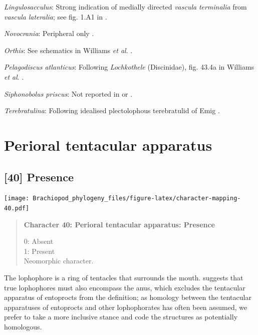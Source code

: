 \documentclass[openany]{book}
\begin{document}
\hypertarget{Lingulosacculus-coding-39}{}
\emph{Lingulosacculus}: Strong indication of medially directed
\emph{vascula} \emph{terminalia} from \emph{vascula} \emph{lateralia};
see fig. 1.A1 in \citet{Balthasar2009EarlyCambrian}.

\hypertarget{Novocrania-coding-39}{}
\emph{Novocrania}: Peripheral only
\citep[p.158]{Williams2000LinguliformeaCraniiformea}.

\hypertarget{Orthis-coding-39}{}
\emph{Orthis}: See schematics in Williams \emph{et al}.
\citeyearpar{Williams2000LinguliformeaCraniiformea}.

\hypertarget{Pelagodiscus_atlanticus-coding-39}{}
\emph{Pelagodiscus atlanticus}: Following \emph{Lochkothele}
(Discinidae), fig. 43.4a in Williams \emph{et al}.
\citeyearpar{Williams2000LinguliformeaCraniiformea}.

\hypertarget{Siphonobolus_priscus-coding-39}{}
\emph{Siphonobolus priscus}: Not reported in
\citet{Havlicek1982LingulaceaPaterinacea} or
\citet{Williams2000LinguliformeaCraniiformea}.

\hypertarget{Terebratulina-coding-39}{}
\emph{Terebratulina}: Following idealised plectolophous terebratulid of
Emig \citeyearpar{Emig1992Functionaldisposition}.

\section{Perioral tentacular
apparatus}\label{perioral-tentacular-apparatus}

\subsection*{{[}40{]} Presence}\label{presence-2}

\texttt{[image: Brachiopod\_phylogeny\_files/figure-latex/character-mapping-40.pdf]}

\begin{quote}
\textbf{Character 40: Perioral tentacular apparatus: Presence}

0: Absent\\
1: Present\\
Neomorphic character.
\end{quote}

The lophophore is a ring of tentacles that surrounds the mouth.
\citet{Temereva2017Innervationof} suggests that true lophophores must
also encompass the anus, which excludes the tentacular apparatus of
entoprocts from the definition; as homology between the tentacular
apparatuses of entoprocts and other lophophorates has often been
assumed, we prefer to take a more inclusive stance and code the
structures as potentially homologous.
\end{document}
